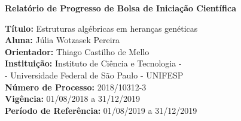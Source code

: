\begin{center}
    \Large{\textbf{Relatório de Progresso de Bolsa de Iniciação Científica}}
\end{center}

\vspace{7em}
\noindent\hrulefill 

\noindent \textbf{Título:} Estruturas algébricas em heranças genéticas
\\ \textbf{Aluna:} Júlia Wotzasek Pereira
\\ \textbf{Orientador:} Thiago Castilho de Mello
\\ \textbf{Instituição:} Instituto de Ciência e Tecnologia -\\ \indent - Universidade Federal de São Paulo - UNIFESP
\\ \textbf{Número de Processo:} 2018/10312-3
\\ \textbf{Vigência:} 01/08/2018 a 31/12/2019
\\ \textbf{Período de Referência:} 01/08/2019 a 31/12/2019

\noindent\hrulefill

\vspace{9em}
\begin{center}
    
\end{center}
